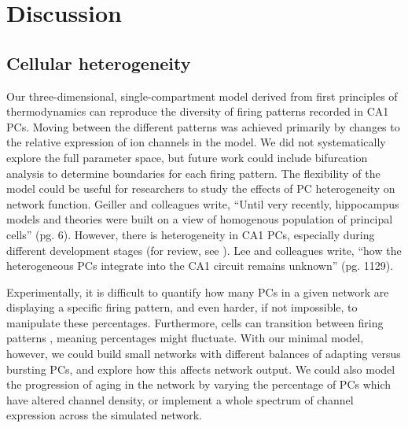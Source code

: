 \documentclass[12pt]{article}
\begin{document}
\section{Discussion}

\subsection{Cellular heterogeneity}

Our three-dimensional, single-compartment model derived from first principles of thermodynamics can reproduce the diversity of firing patterns recorded in CA1 PCs. Moving between the different patterns was achieved primarily by changes to the relative expression of ion channels in the model. We did not systematically explore the full parameter space, but future work could include bifurcation analysis to determine boundaries for each firing pattern. The flexibility of the model could be useful for researchers to study the effects of PC heterogeneity on network function. Geiller and colleagues \citep{geiller2017segregated} write, ``Until very recently, hippocampus models and theories were built on a view of homogenous population of principal cells'' (pg. 6). However, there is heterogeneity in CA1 PCs, especially during different development stages (for review, see \cite{mckiernan2017ca1}). Lee and colleagues \citep{lee2014parvalbumin} write, ``how the heterogeneous PCs integrate into the CA1 circuit remains unknown'' (pg. 1129). 

Experimentally, it is difficult to quantify how many PCs in a given network are displaying a specific firing pattern, and even harder, if not impossible, to manipulate these percentages. Furthermore, cells can transition between firing patterns \citep{steriade1998dynamic}, meaning percentages might fluctuate. With our minimal model, however, we could build small networks with different balances of adapting versus bursting PCs, and explore how this affects network output.
We could also model the progression of aging in the network by varying the percentage of PCs which have altered {\Ca} channel density, or implement a whole spectrum of channel expression across the simulated network.
\end{document}

